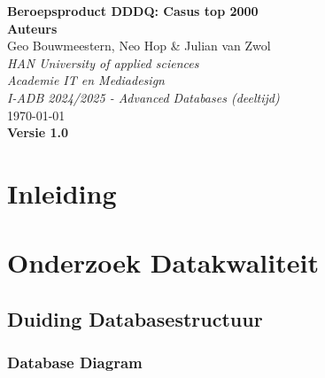 \documentclass{report}
\begin{document}
    \begin{titlepage}
        \centering
        \vspace*{2cm}  %
        \Huge
        \textbf{Beroepsproduct DDDQ: Casus top 2000} \\[1.5cm]  %

        \large
        \textbf{Auteurs} \\[0.25cm]
        \textnormal{Geo Bouwmeestern, Neo Hop \& Julian van Zwol} \\[2.25cm]

        \textit{HAN University of applied sciences} \\[0.25cm]
        \textit{Academie IT en Mediadesign} \\[0.25cm]
        \textit{I-ADB 2024/2025 - Advanced Databases (deeltijd)} \\[0.25cm]

        \vfill
        \today \\[0.25cm]  %
        \textbf{Versie 1.0} \\[1cm]
    \end{titlepage}

    \renewcommand{\contentsname}{Inhoud}
    \tableofcontents

    \chapter{Inleiding}\label{chapter:Inleiding}

    \chapter{Onderzoek Datakwaliteit}\label{chapter:Onderzoek Datakwaliteit}

        \section{Duiding Databasestructuur}

            \subsection{Database Diagram}
\end{document}
